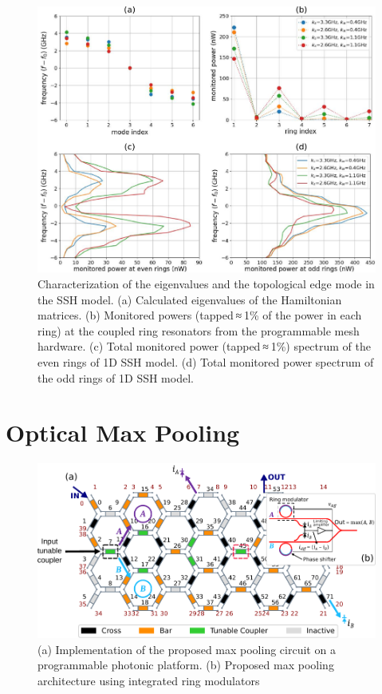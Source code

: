 \begin{figure}
	\begin{center}
		\includegraphics{figures/ch3-topological-power_meter.pdf}
	\end{center}
	\caption{Characterization of the eigenvalues and the topological edge mode in the SSH model. (a) Calculated eigenvalues of the Hamiltonian matrices. (b) Monitored powers (tapped ≈ 1\% of the power in
		each ring) at the coupled ring resonators from the programmable mesh hardware. (c) Total monitored power (tapped ≈ 1\%) spectrum of the even rings of 1D SSH model. (d) Total monitored power spectrum
		of the odd rings of 1D SSH model.}\label{fig:ch3-topological-power_meter}
\end{figure}


\section{Optical Max Pooling}\label{sec:optical_max_pooling} %

\begin{figure}[b!]
	\begin{center}
		\includegraphics{figures/ch3-maxpool-circuit.pdf}
	\end{center}
	\caption{(a) Implementation of the proposed max pooling circuit on a programmable photonic platform.  (b) Proposed max pooling architecture using integrated ring modulators}\label{fig:ch3-maxpool-circuit}
\end{figure}

